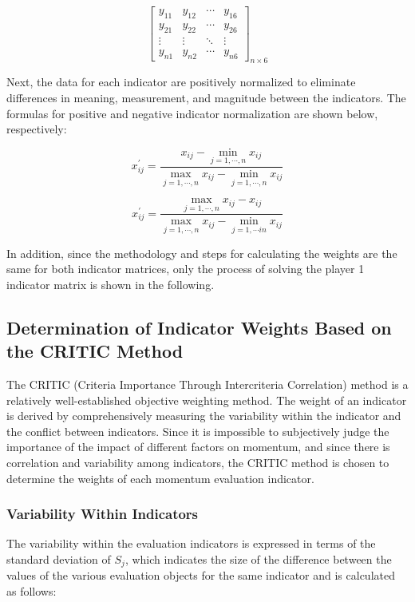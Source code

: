 \documentclass[12pt]{article}  %
\begin{document}
\begin{equation}
	\left[\begin{array}{cccc}
		y_{11} & y_{12} & \cdots & y_{16} \\
		y_{21} & y_{22} & \cdots & y_{26} \\
		\vdots & \vdots & \ddots & \vdots \\
		y_{n 1} & y_{n 2} & \cdots & y_{n 6}
	\end{array}\right]_{n \times 6}
\end{equation}

Next, the data for each indicator are positively normalized to eliminate differences in meaning, measurement, and magnitude between the indicators. The formulas for positive and negative indicator normalization are shown below, respectively:

\begin{equation}
	x_{i j}^{\prime}=\frac{x_{i j}-\min_{j=1, \cdots, n} x_{i j}}{\max _{j=1, \cdots, n} x_{i j}-\min _{j=1, \cdots, n} x_{i j}}
\end{equation}

\begin{equation}
	x_{i j}^{\prime}=\frac{\max _{j=1, \cdots, n} x_{i j}-x_{i j}}{\max_{j=1, \cdots, n} x_{i j}-\min_{j=1, \cdots i n} x_{i j}}
\end{equation}

In addition, since the methodology and steps for calculating the weights are the same for both indicator matrices, only the process of solving the player 1 indicator matrix is shown in the following.

\subsection{Determination of Indicator Weights Based on the CRITIC Method}
The CRITIC (Criteria Importance Through Intercriteria Correlation) method is a relatively well-established objective weighting method. The weight of an indicator is derived by comprehensively measuring the variability within the indicator and the conflict between indicators. Since it is impossible to subjectively judge the importance of the impact of different factors on momentum, and since there is correlation and variability among indicators, the CRITIC method is chosen to determine the weights of each momentum evaluation indicator.

\subsubsection*{Variability Within Indicators}
The variability within the evaluation indicators is expressed in terms of the standard deviation of $S_j$, which indicates the size of the difference between the values of the various evaluation objects for the same indicator and is calculated as follows:
\end{document}
